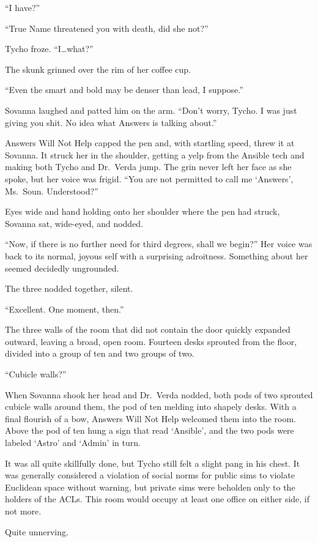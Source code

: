 ``I have?''

``True Name threatened you with death, did she not?''

Tycho froze. ``I\ldots what?''

The skunk grinned over the rim of her coffee cup.

``Even the smart and bold may be denser than lead, I suppose.''

Sovanna laughed and patted him on the arm. ``Don't worry, Tycho. I was just giving you shit. No idea what Answers is talking about.''

Answers Will Not Help capped the pen and, with startling speed, threw it at Sovanna. It struck her in the shoulder, getting a yelp from the Ansible tech and making both Tycho and Dr.~Verda jump. The grin never left her face as she spoke, but her voice was frigid. ``You are not permitted to call me `Answers', Ms.~Soun. Understood?''

Eyes wide and hand holding onto her shoulder where the pen had struck, Sovanna sat, wide-eyed, and nodded.

``Now, if there is no further need for third degrees, shall we begin?'' Her voice was back to its normal, joyous self with a surprising adroitness. Something about her seemed decidedly ungrounded.

The three nodded together, silent.

``Excellent. One moment, then.''

The three walls of the room that did not contain the door quickly expanded outward, leaving a broad, open room. Fourteen desks sprouted from the floor, divided into a group of ten and two groups of two.

``Cubicle walls?''

When Sovanna shook her head and Dr.~Verda nodded, both pods of two sprouted cubicle walls around them, the pod of ten melding into shapely desks. With a final flourish of a bow, Answers Will Not Help welcomed them into the room. Above the pod of ten hung a sign that read `Ansible', and the two pods were labeled `Astro' and `Admin' in turn.

It was all quite skillfully done, but Tycho still felt a slight pang in his chest. It was generally considered a violation of social norms for public sims to violate Euclidean space without warning, but private sims were beholden only to the holders of the ACLs. This room would occupy at least one office on either side, if not more.

Quite unnerving.

